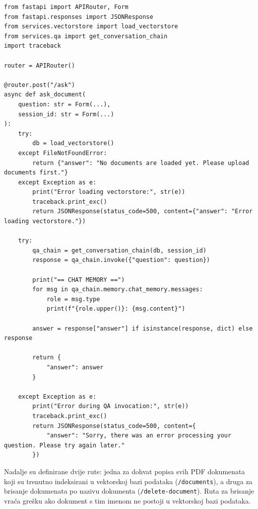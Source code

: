 \documentclass[]{foi}
\begin{document}
\begin{longlisting}
\begin{verbatim}
from fastapi import APIRouter, Form
from fastapi.responses import JSONResponse
from services.vectorstore import load_vectorstore
from services.qa import get_conversation_chain
import traceback

router = APIRouter()

@router.post("/ask")
async def ask_document(
    question: str = Form(...),
    session_id: str = Form(...)
):
    try:
        db = load_vectorstore()
    except FileNotFoundError:
        return {"answer": "No documents are loaded yet. Please upload documents first."}
    except Exception as e:
        print("Error loading vectorstore:", str(e))
        traceback.print_exc()
        return JSONResponse(status_code=500, content={"answer": "Error loading vectorstore."})

    try:
        qa_chain = get_conversation_chain(db, session_id)
        response = qa_chain.invoke({"question": question})

        print("== CHAT MEMORY ==")
        for msg in qa_chain.memory.chat_memory.messages:
            role = msg.type
            print(f"{role.upper()}: {msg.content}")

        answer = response["answer"] if isinstance(response, dict) else response

        return {
            "answer": answer
        }

    except Exception as e:
        print("Error during QA invocation:", str(e))
        traceback.print_exc()
        return JSONResponse(status_code=500, content={
            "answer": "Sorry, there was an error processing your question. Please try again later."
        })
\end{verbatim}
\caption{ask.py}
\label{lst:ask}
\end{longlisting}

Nadalje su definirane dvije rute: jedna za dohvat popisa svih PDF dokumenata koji su trenutno indeksirani u vektorskoj bazi podataka (\verb|/documents|), a druga
za brisanje dokumenata po nazivu dokumenta (\verb|/delete-document|). Ruta za brisanje vraća grešku ako dokument s tim imenom ne postoji u vektorskoj bazi podataka.
\end{document}
